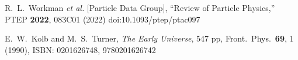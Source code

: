 \documentclass[Universe,article,submit,moreauthors,pdftex]{Definitions/mdpi}
\begin{document}
\begin{thebibliography}{99}

R.~L.~Workman \textit{et al.} [Particle Data Group],
``Review of Particle Physics,''
PTEP \textbf{2022}, 083C01 (2022)
doi:10.1093/ptep/ptac097

E.~W.~Kolb and M.~S.~Turner,
\emph{The Early Universe},
547 pp, Front.\ Phys.\ {\bf 69}, 1 (1990),
ISBN: 0201626748, 9780201626742


 


\end{thebibliography}

\end{document}
